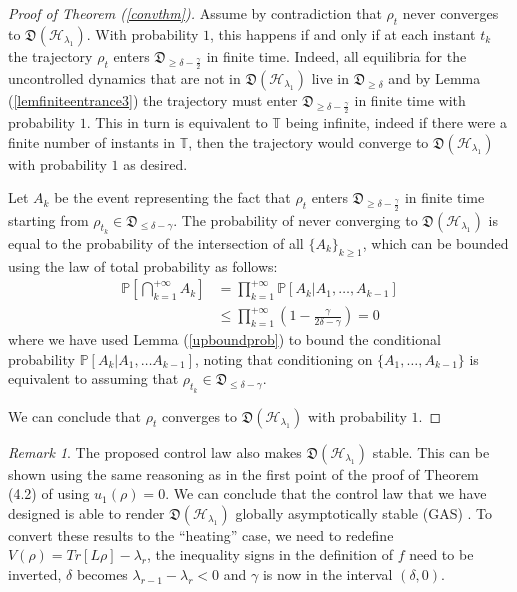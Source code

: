\documentclass[conference]{IEEEtran}
\newcommand{\DHL}[1]{\mathfrak D(\mathcal H_{#1})}
\theoremstyle{plain}
\theoremstyle{plain}
\theoremstyle{plain}
\theoremstyle{plain}
\theoremstyle{remark}
\newtheorem*{rem}{Remark}
\theoremstyle{definition}
\begin{document}
\begin{proof}[Proof of Theorem (\ref{convthm})]

    Assume by contradiction that $\rho_t$ never converges to $\DHL{\lambda_1}$. With probability $1$, this happens if and only if at each instant $t_k$ the trajectory $\rho_t$ enters $\mathfrak D_{\ge \delta - \frac{\gamma}{2}}$ in finite time. Indeed, all equilibria for the uncontrolled dynamics that are not in $\DHL{\lambda_1}$ live in $\mathfrak D_{\ge \delta}$ and by Lemma (\ref{lemfiniteentrance3}) the trajectory must enter $\mathfrak D_{\ge \delta - \frac{\gamma}{2}}$ in finite time with probability $1$. This in turn is equivalent to $\mathbb T$ being infinite, indeed if there were a finite number of instants in $\mathbb T$, then the trajectory would converge to $\DHL{\lambda_1}$ with probability $1$ as desired.

    Let $A_k$ be the event representing the fact that $\rho_t$ enters $\mathfrak D_{\ge \delta - \frac{\gamma}{2}}$ in finite time starting from $\rho_{t_k} \in \mathfrak D_{\le \delta - \gamma}$. The probability of never converging to $\DHL{\lambda_1}$ is equal to the probability of the intersection of all $\{A_k\}_{k \ge 1}$, which can be bounded using the law of total probability as follows: \begin{align}
        \mathbb P \left[\bigcap_{k = 1}^{+\infty} A_k\right] \nonumber  &= \prod_{k = 1}^{+\infty} \mathbb P[A_k | A_1, \dots, A_{k - 1}] \nonumber \\ &
        \le \prod^{+\infty}_{k = 1} \left(1 - \frac{\gamma}{2\delta - \gamma}\right) = 0
    \end{align}
    where we have used Lemma (\ref{upboundprob}) to bound the conditional probability $\mathbb P[A_k | A_1, \dots A_{k - 1}]$, noting that conditioning on $\{A_1, \dots, A_{k - 1}\}$ is equivalent to assuming that $\rho_{t_k} \in \mathfrak D_{\le \delta - \gamma}$.    

    We can conclude that $\rho_t$ converges to $\DHL{\lambda_1}$ with probability $1$.
    \end{proof}
\begin{rem}
The proposed control law also makes $\DHL{\lambda_1}$ stable. This can be shown using the same reasoning as in the first point of the proof of Theorem (4.2) of \cite{mirrahimi} using $u_1(\rho) = 0$. We can conclude that the control law that we have designed is able to render $\DHL{\lambda_1}$ globally asymptotically stable (GAS) \cite{vanhandel}. To convert these results to the ``heating'' case, we need to redefine $V(\rho) = Tr[L\rho] - \lambda_r$, the inequality signs in the definition of $f$ need to be inverted, $\delta$ becomes $\lambda_{r - 1} - \lambda_{r} < 0$ and $\gamma$ is now in the interval $(\delta, 0)$.
\end{rem}
\end{document}
